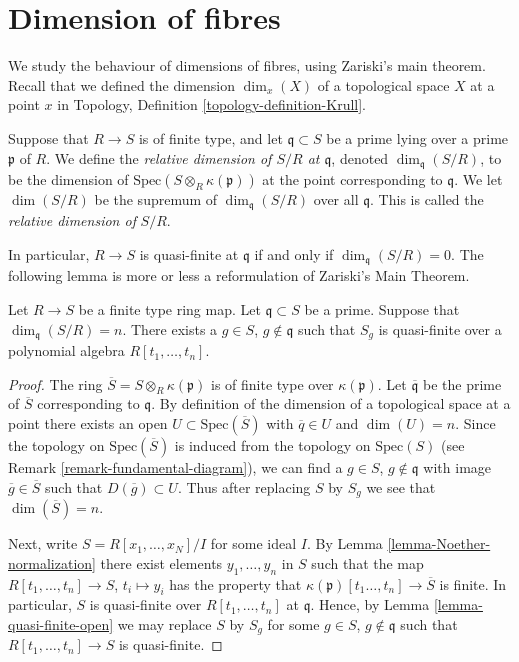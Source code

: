 \section{Dimension of fibres}
\label{section-dimension-fibres}

\noindent
We study the behaviour of dimensions of fibres, using 
Zariski's main theorem. Recall that we defined the
dimension $\dim_x(X)$ of a topological space $X$ at a point $x$
in Topology, Definition \ref{topology-definition-Krull}.

\begin{definition}
\label{definition-relative-dimension}
Suppose that $R \to S$ is of finite type, and let
$\mathfrak q \subset S$ be a prime lying over a prime
$\mathfrak p$ of $R$.
We define the {\it relative dimension
of $S/R$ at $\mathfrak q$}, denoted
$\dim_{\mathfrak q}(S/R)$, to be the dimension
of $\text{Spec}(S \otimes_R \kappa(\mathfrak p))$
at the point corresponding to $\mathfrak q$. We let
$\dim(S/R)$ be the supremum of $\dim_{\mathfrak q}(S/R)$
over all $\mathfrak q$. This is called the
{\it relative dimension of} $S/R$.
\end{definition}

\noindent
In particular, $R \to S$ is quasi-finite at $\mathfrak q$ if
and only if $\dim_{\mathfrak q}(S/R) = 0$. The following lemma
is more or less a reformulation of Zariski's Main Theorem.

\begin{lemma}
\label{lemma-quasi-finite-over-polynomial-algebra}
Let $R \to S$ be a finite type ring map.
Let $\mathfrak q \subset S$ be a prime.
Suppose that $\dim_{\mathfrak q}(S/R) = n$.
There exists a $g \in S$, $g \not\in \mathfrak q$
such that $S_g$ is quasi-finite over a
polynomial algebra $R[t_1,\ldots, t_n]$.
\end{lemma}

\begin{proof}
The ring $\overline{S} = S \otimes_R \kappa(\mathfrak p)$ is
of finite type over $\kappa(\mathfrak p)$.
Let $\overline{\mathfrak q}$ be the prime of $\overline{S}$
corresponding to $\mathfrak q$.
By definition of
the dimension of a topological space at a point there exists
an open $U \subset \text{Spec}(\overline{S})$ with 
$\overline{q} \in U$ and $\dim(U) = n$.
Since the topology on $\text{Spec}(\overline{S})$ is
induced from the topology on $\text{Spec}(S)$ (see
Remark \ref{remark-fundamental-diagram}), we can find
a $g \in S$, $g \not \in \mathfrak q$ with image
$\overline{g} \in \overline{S}$ such that
$D(\overline{g}) \subset U$.
Thus after replacing $S$ by $S_g$ we see that
$\dim(\overline{S}) = n$.

\medskip\noindent
Next, write $S = R[x_1,\ldots,x_N]/I$ for some ideal $I$. 
By Lemma \ref{lemma-Noether-normalization} there exist
elements $y_1, \ldots, y_n$ in $S$ such that the map
$R[t_1,\ldots, t_n] \to S$, $t_i \mapsto y_i$ has the property
that $\kappa(\mathfrak p)[t_1\ldots, t_n] \to \overline{S}$
is finite. In particular, $S$ is quasi-finite over $R[t_1,\ldots,t_n]$
at $\mathfrak q$. Hence, by Lemma \ref{lemma-quasi-finite-open}
we may replace $S$ by $S_g$ for some $g\in S$, $g \not \in \mathfrak q$
such that $R[t_1,\ldots,t_n] \to S$ is quasi-finite.
\end{proof}

